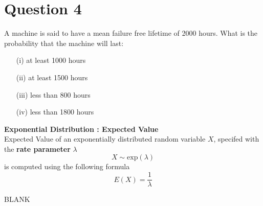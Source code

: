 \documentclass[a4paper,12pt]{article}
\begin{document}
\large 

\section*{Question 4}
A machine is said to have a mean failure free lifetime of 2000 hours. What is the probability that the machine will last:

\begin{itemize}
\item[(i)] at least 1000 hours
\item[(ii)]at least 1500 hours
\item[(iii)]less than 800 hours
\item[(iv)]less than 1800 hours
\end{itemize}
\begin{framed}
\noindent \textbf{Exponential Distribution : Expected Value}\\
\smallskip
\noindent Expected Value of an exponentially distributed random variable $X$, specifed with the \textbf{rate parameter} $\lambda$
\[ X \sim \mbox{exp}(\lambda)  \]
is computed using the following formula
\[ E(X) = \frac{1}{\lambda} \]
\end{framed}


BLANK
\end{document}
